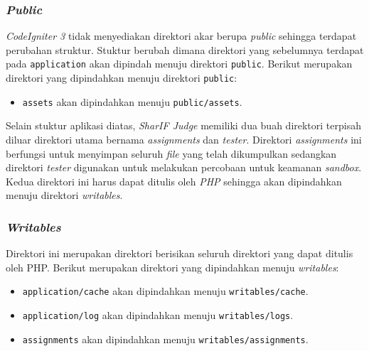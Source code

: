 \subsubsection{\textit{Public}}
\textit{CodeIgniter 3} tidak menyediakan direktori akar berupa \textit{public} sehingga terdapat perubahan struktur. Stuktur berubah dimana direktori yang sebelumnya terdapat pada \texttt{application} akan dipindah menuju direktori \texttt{public}. Berikut merupakan direktori yang dipindahkan menuju direktori \texttt{public}:
\begin{itemize}
\item \verb|assets| akan dipindahkan menuju \texttt{public/assets}.
\end{itemize}

Selain stuktur aplikasi diatas, \textit{SharIF Judge} memiliki dua buah direktori terpisah diluar direktori utama bernama \textit{assignments} dan \textit{tester}. Direktori \textit{assignments} ini berfungsi untuk menyimpan seluruh \textit{file} yang telah dikumpulkan sedangkan direktori \textit{tester} digunakan untuk melakukan percobaan untuk keamanan \textit{sandbox}. Kedua direktori ini harus dapat ditulis oleh \textit{PHP} sehingga akan dipindahkan menuju direktori \textit{writables}.

\subsubsection{\textit{Writables}}
Direktori ini merupakan direktori berisikan seluruh direktori yang dapat ditulis oleh PHP. Berikut merupakan direktori yang dipindahkan menuju \textit{writables}:
\begin{itemize}
\item \verb|application/cache| akan dipindahkan menuju \texttt{writables/cache}.
\item \verb|application/log| akan dipindahkan menuju \texttt{writables/logs}.
\item \verb|assignments| akan dipindahkan menuju \texttt{writables/assignments}.
\end{itemize}

